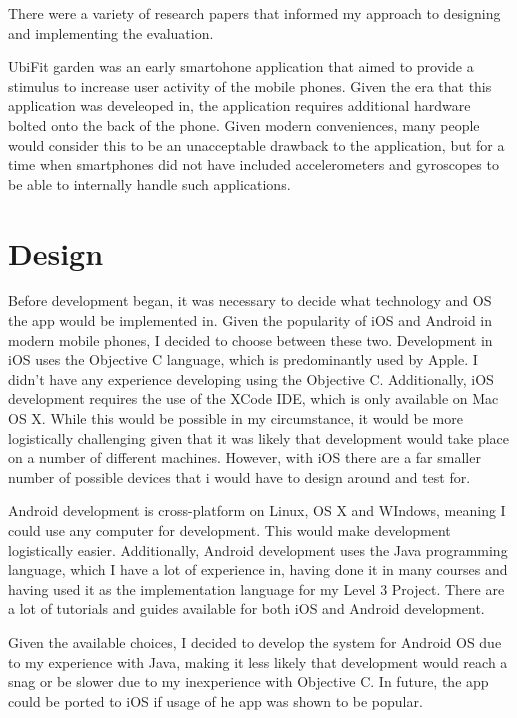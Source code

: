 \documentclass{l4proj}
\begin{document}
There were a variety of research papers that informed my approach to designing and implementing the evaluation.

UbiFit garden was an early smartohone application that aimed to provide a stimulus to increase user activity of the mobile phones. Given the era that this application was develeoped in, the application requires additional hardware bolted onto the back of the phone. Given modern conveniences, many people would consider this to be an unacceptable drawback to the application, but for a time when smartphones did not have included accelerometers and gyroscopes to be able to internally handle such applications.


\chapter{Design}

Before development began, it was necessary to decide what technology and OS the app would be implemented in. Given the popularity of iOS and Android in modern mobile phones, I decided to choose between these two. Development in iOS uses the Objective C language, which is predominantly used by Apple. I didn’t have any experience developing using the Objective C. Additionally, iOS development requires the use of the XCode IDE, which is only available on Mac OS X.  While this would be possible in my circumstance, it would be more logistically challenging given that it was likely that development would take place on a number of different machines. However, with iOS there are a far smaller number of possible devices that i would have to design around and test for.

Android development is cross-platform on Linux, OS X and WIndows, meaning I could use any computer for development. This would make development logistically easier. Additionally, Android development uses the Java programming language, which I have a lot of experience in, having done it in many courses and having used it as the implementation language for my Level 3 Project. There are a lot of tutorials and guides available for both iOS and Android development.

Given the available choices, I decided to develop the system for Android OS due to my experience with Java, making it less likely that development would reach a snag or be slower due to my inexperience with Objective C. In future, the app could be ported to iOS if usage of he app was shown to be popular.
\end{document}
